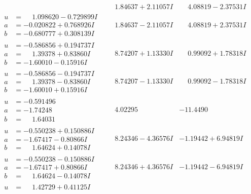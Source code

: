 \documentclass[1p]{elsarticle_modified}
\theoremstyle{definition}
\begin{document}
$$\begin{array}{c|c|c}
 & \phantom{-}1.84637 + 2.11057 I & \phantom{-}4.08819 - 2.37531 I \\ \hline\begin{aligned}
u &= \phantom{-}1.098620 - 0.729899 I \\
a &= -0.020822 + 0.768926 I \\
b &= -0.680777 + 0.308139 I\end{aligned}
 & \phantom{-}1.84637 - 2.11057 I & \phantom{-}4.08819 + 2.37531 I \\ \hline\begin{aligned}
u &= -0.586856 + 0.194737 I \\
a &= \phantom{-}1.39378 + 0.83860 I \\
b &= -1.60010 - 0.15916 I\end{aligned}
 & \phantom{-}8.74207 + 1.13330 I & \phantom{-}0.99092 + 1.78318 I \\ \hline\begin{aligned}
u &= -0.586856 - 0.194737 I \\
a &= \phantom{-}1.39378 - 0.83860 I \\
b &= -1.60010 + 0.15916 I\end{aligned}
 & \phantom{-}8.74207 - 1.13330 I & \phantom{-}0.99092 - 1.78318 I \\ \hline\begin{aligned}
u &= -0.591496\phantom{ +0.000000I} \\
a &= -1.74248\phantom{ +0.000000I} \\
b &= \phantom{-}1.64031\phantom{ +0.000000I}\end{aligned}
 & \phantom{-}4.02295\phantom{ +0.000000I} & -11.4490\phantom{ +0.000000I} \\ \hline\begin{aligned}
u &= -0.550238 + 0.150886 I \\
a &= -1.67417 - 0.80866 I \\
b &= \phantom{-}1.64624 + 0.14078 I\end{aligned}
 & \phantom{-}8.24346 - 4.36576 I & -1.19442 + 6.94819 I \\ \hline\begin{aligned}
u &= -0.550238 - 0.150886 I \\
a &= -1.67417 + 0.80866 I \\
b &= \phantom{-}1.64624 - 0.14078 I\end{aligned}
 & \phantom{-}8.24346 + 4.36576 I & -1.19442 - 6.94819 I \\ \hline\begin{aligned}
u &= \phantom{-}1.42729 + 0.41125 I \\

\end{aligned}
\end{array}$$
\end{document}
